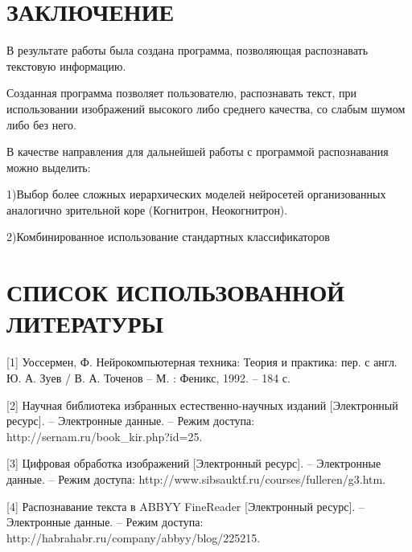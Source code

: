 \documentclass[14pt,a4paper]{extreport}
\begin{document}
 	
 	
	\newpage
	\section*{\center\normalsize ЗАКЛЮЧЕНИЕ \endcenter}
	\hspace{4ex}В результате работы была создана программа, позволяющая распознавать текстовую информацию. \

	\hspace{4ex}Созданная программа позволяет пользователю, распознавать текст, при использовании изображений высокого либо среднего качества, со слабым шумом либо без него.\

\hspace{4ex}В качестве направления для дальнейшей работы с программой распознавания  можно выделить:\

\hspace{4ex} 1)Выбор более сложных иерархических моделей нейросетей организованных аналогично зрительной коре (Когнитрон, Неокогнитрон).

\hspace{4ex} 2)Комбинированное использование стандартных классификаторов




	\newpage
	\section*{\center\normalsize СПИСОК ИСПОЛЬЗОВАННОЙ ЛИТЕРАТУРЫ \endcenter}

\hspace{4ex}[1] Уоссермен, Ф. Нейрокомпьютерная техника:  Теория и практика: пер. с англ. Ю. А. Зуев / В. А. Точенов – М. : Феникс, 1992. – 184 с.\
 
\hspace{4ex}[2] Научная библиотека избранных естественно-научных изданий [Электронный ресурс]. – Электронные данные. – Режим доступа: http://sernam.ru/book_kir.php?id=25.\

\hspace{4ex}[3] Цифровая обработка изображений [Электронный ресурс]. – Электронные данные. – Режим доступа: http://www.sibsauktf.ru/courses/fulleren/g3.htm.\

\hspace{4ex}[4] Распознавание текста в ABBYY FineReader [Электронный ресурс]. – Электронные данные. – Режим доступа: http://habrahabr.ru/company/abbyy/blog/225215.\
\end{document}
